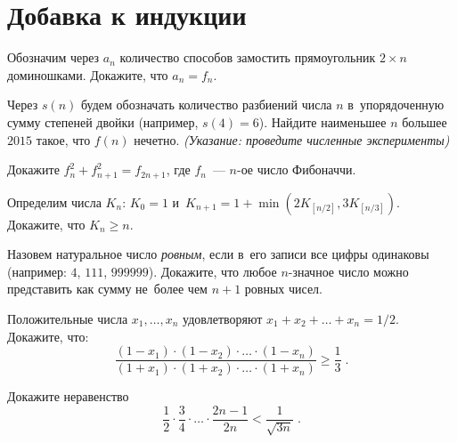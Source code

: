 
\section*{Добавка к индукции}


\begin{problems}

\item
Обозначим через $a_n$ количество способов замостить прямоугольник $2 \times n$
доминошками.
Докажите, что $a_n = f_n$.

\item
Через $s(n)$ будем обозначать количество разбиений числа $n$ в~упорядоченную
сумму степеней двойки (например, $s(4) = 6$).
Найдите наименьшее $n$ большее $2015$ такое, что $f(n)$ нечетно.
\emph{(Указание: проведите численные эксперименты)}

\item
Докажите $f_{n}^{2} + f_{n + 1}^{2} = f_{2n + 1}$,
где $f_n$~--- $n$-ое число Фибоначчи.

\item
Определим числа $K_n$:
$K_0 = 1$
и~\(
    K_{n + 1}
=
    1 + \min (2 K_{[n / 2]}, 3 K_{[n / 3]})
\).
Докажите, что $K_n \geq n$.

\item
Назовем натуральное число \emph{ровным}, если в~его записи все цифры одинаковы
(например: $4$, $111$, $999999$).
Докажите, что любое $n$-значное число можно представить как сумму не~более чем 
$n + 1$ ровных чисел.

\item
Положительные числа $x_1, \ldots, x_n$ удовлетворяют
$x_1 + x_2 + \ldots + x_n = 1 / 2$.
Докажите, что:
\[
    \frac
        {(1 - x_1) \cdot (1 - x_2) \cdot \ldots \cdot (1 - x_n)}
        {(1 + x_1) \cdot (1 + x_2) \cdot \ldots \cdot (1 + x_n)}
\geq
    \frac{1}{3}
\;.\]

\item
Докажите неравенство
\[
    \frac{1}{2} \cdot
    \frac{3}{4} \cdot
    \ldots \cdot
    \frac{2 n - 1}{2 n}
<
    \frac{1}{\sqrt{3 n}}
\;.\]

\end{problems}

